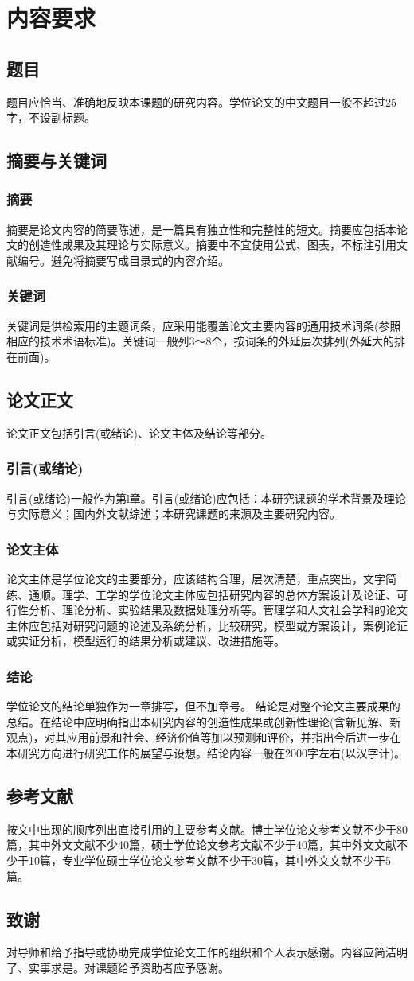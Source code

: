 
\chapter{内容要求}
\section{题目}
题目应恰当、准确地反映本课题的研究内容。学位论文的中文题目一般不超过25字，不设副标题。
\section{摘要与关键词}
\subsection{摘要}
摘要是论文内容的简要陈述，是一篇具有独立性和完整性的短文。摘要应包括本论文的创造性成果及其理论与实际意义。摘要中不宜使用公式、图表，不标注引用文献编号。避免将摘要写成目录式的内容介绍。
\subsection{关键词}
关键词是供检索用的主题词条，应采用能覆盖论文主要内容的通用技术词条(参照相应的技术术语标准)。关键词一般列3～8个，按词条的外延层次排列(外延大的排在前面)。
\section{论文正文}
论文正文包括引言(或绪论)、论文主体及结论等部分。
\subsection{引言(或绪论)}
引言(或绪论)一般作为第l章。引言(或绪论)应包括：本研究课题的学术背景及理论与实际意义；国内外文献综述；本研究课题的来源及主要研究内容。
\subsection{论文主体}
论文主体是学位论文的主要部分，应该结构合理，层次清楚，重点突出，文字简练、通顺。理学、工学的学位论文主体应包括研究内容的总体方案设计及论证、可行性分析、理论分析、实验结果及数据处理分析等。管理学和人文社会学科的论文主体应包括对研究问题的论述及系统分析，比较研究，模型或方案设计，案例论证或实证分析，模型运行的结果分析或建议、改进措施等。
\subsection{结论}
学位论文的结论单独作为一章排写，但不加章号。
结论是对整个论文主要成果的总结。在结论中应明确指出本研究内容的创造性成果或创新性理论(含新见解、新观点)，对其应用前景和社会、经济价值等加以预测和评价，并指出今后进一步在本研究方向进行研究工作的展望与设想。结论内容一般在2000字左右(以汉字计)。
\section{参考文献}
按文中出现的顺序列出直接引用的主要参考文献。博士学位论文参考文献不少于80篇，其中外文文献不少40篇，硕士学位论文参考文献不少于40篇，其中外文文献不少于10篇，专业学位硕士学位论文参考文献不少于30篇，其中外文文献不少于5篇。
\section{致谢}
对导师和给予指导或协助完成学位论文工作的组织和个人表示感谢。内容应简洁明了、实事求是。对课题给予资助者应予感谢。
